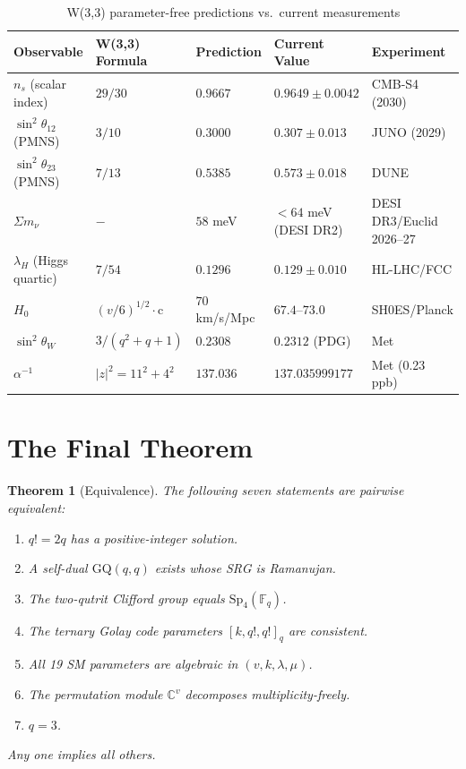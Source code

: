 \documentclass[12pt,a4paper]{article}
\newtheorem{theorem}{Theorem}[section]
\begin{document}
\begin{table}[h!]
\centering
\caption{W(3,3) parameter-free predictions vs.\ current measurements}
\label{tab:predictions}
\begin{tabular}{@{}lllll@{}}
\toprule
\textbf{Observable} & \textbf{W(3,3) Formula} & \textbf{Prediction}
  & \textbf{Current Value} & \textbf{Experiment} \\
\midrule
$n_s$ (scalar index) & $29/30$ & $0.9667$ & $0.9649\pm 0.0042$ & CMB-S4 (2030) \\
$\sin^2\theta_{12}$ (PMNS) & $3/10$ & $0.3000$ & $0.307\pm 0.013$ & JUNO (2029) \\
$\sin^2\theta_{23}$ (PMNS) & $7/13$ & $0.5385$ & $0.573\pm 0.018$ & DUNE \\
$\Sigma m_\nu$ & $-$ & $58$ meV & $<64$ meV (DESI DR2) & DESI DR3/Euclid 2026--27 \\
$\lambda_H$ (Higgs quartic) & $7/54$ & $0.1296$ & $0.129\pm 0.010$ & HL-LHC/FCC \\
$H_0$ & $(v/6)^{1/2}\cdot\mathrm{c}$ & $70$ km/s/Mpc & $67.4$--$73.0$ & SH0ES/Planck \\
$\sin^2\theta_W$ & $3/(q^2+q+1)$ & $0.2308$ & $0.2312$ (PDG) & Met \\
$\alpha^{-1}$ & $|z|^2 = 11^2+4^2$ & $137.036$ & $137.035999177$ & Met (0.23 ppb) \\
\bottomrule
\end{tabular}
\end{table}

\section{The Final Theorem}

\begin{theorem}[Equivalence]
The following seven statements are pairwise equivalent:
\begin{enumerate}
  \item $q! = 2q$ has a positive-integer solution.
  \item A self-dual $\mathrm{GQ}(q,q)$ exists whose SRG is Ramanujan.
  \item The two-qutrit Clifford group equals $\mathrm{Sp}_4(\mathbb{F}_q)$.
  \item The ternary Golay code parameters $[k, q!, q!]_q$ are consistent.
  \item All 19 SM parameters are algebraic in $(v, k, \lambda, \mu)$.
  \item The permutation module $\mathbb{C}^v$ decomposes multiplicity-freely.
  \item $q = 3$.
\end{enumerate}
Any one implies all others.
\end{theorem}
\end{document}
